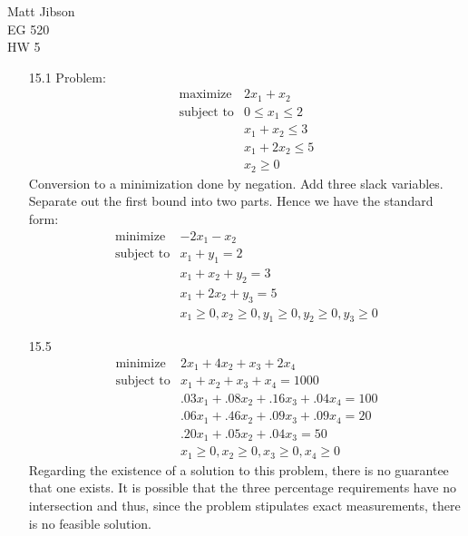 \documentclass{article}
\begin{document}
\begin{flushright}
Matt Jibson \\
EG 520 \\
HW 5
\end{flushright}

\begin{itemize}
	\item[15.1] Problem:
		\begin{displaymath}
			\begin{array}{rl}
				\textrm{maximize} & 2x_1 + x_2 \\
				\textrm{subject to} & 0 \le x_1 \le 2 \\
				& x_1 + x_2 \le 3 \\
				& x_1 + 2x_2 \le 5 \\
				& x_2 \ge 0
			\end{array}
		\end{displaymath}
		Conversion to a minimization done by negation. Add three slack variables. Separate out the first bound into two parts. Hence we have the standard form:
		\begin{displaymath}
			\begin{array}{rl}
				\textrm{minimize} & -2x_1 - x_2 \\
				\textrm{subject to} & x_1 + y_1 = 2 \\
				& x_1 + x_2 + y_2 = 3 \\
				& x_1 + 2x_2 + y_3 = 5 \\
				& x_1 \ge 0, x_2 \ge 0, y_1 \ge 0, y_2 \ge 0, y_3 \ge 0
			\end{array}
		\end{displaymath}
	\item[15.5]
		\begin{displaymath}
			\begin{array}{rl}
				\textrm{minimize} & 2x_1 + 4x_2 + x_3 + 2x_4 \\
				\textrm{subject to} & x_1 + x_2 + x_3 + x_4 = 1000 \\
				& .03x_1 + .08x_2 + .16x_3 + .04x_4 = 100 \\
				& .06x_1 + .46x_2 + .09x_3 + .09x_4 = 20 \\
				& .20x_1 + .05x_2 + .04x_3 = 50 \\
				& x_1 \ge 0, x_2 \ge 0, x_3 \ge 0, x_4 \ge 0
			\end{array}
		\end{displaymath}
		Regarding the existence of a solution to this problem, there is no guarantee that one exists. It is possible that the three percentage requirements have no intersection and thus, since the problem stipulates exact measurements, there is no feasible solution.

\end{itemize}
\end{document}
